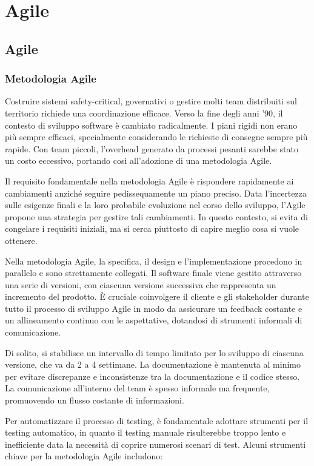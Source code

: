 \chapter{Agile}
\section{Agile}
\subsection{Metodologia Agile}
Costruire sistemi safety-critical, governativi o gestire molti team distribuiti sul territorio richiede una
coordinazione efficace. Verso la fine degli anni '90, il contesto di sviluppo software è cambiato radicalmente.
I piani rigidi non erano più sempre efficaci, specialmente considerando le richieste di consegne sempre più rapide.
Con team piccoli, l'overhead generato da processi pesanti sarebbe stato un costo eccessivo, portando così all'adozione
di una metodologia Agile.

Il requisito fondamentale nella metodologia Agile è rispondere rapidamente ai cambiamenti anziché seguire pedissequamente
un piano preciso. Data l'incertezza sulle esigenze finali e la loro probabile evoluzione nel corso dello sviluppo,
l'Agile propone una strategia per gestire tali cambiamenti. In questo contesto, si evita di congelare i requisiti
iniziali, ma si cerca piuttosto di capire meglio cosa si vuole ottenere.

Nella metodologia Agile, la specifica, il design e l'implementazione procedono in parallelo e sono strettamente collegati.
Il software finale viene gestito attraverso una serie di versioni, con ciascuna versione successiva che rappresenta un
incremento del prodotto. È cruciale coinvolgere il cliente e gli stakeholder durante tutto il processo di sviluppo Agile
in modo da assicurare un feedback costante e un allineamento continuo con le aspettative,
dotandosi di strumenti informali di comunicazione.

Di solito, si stabilisce un intervallo di tempo limitato per lo sviluppo di ciascuna versione, che va da 2 a 4 settimane.
La documentazione è mantenuta al minimo per evitare discrepanze e inconsistenze tra la documentazione e il codice stesso.
La comunicazione all'interno del team è spesso informale ma frequente, promuovendo un flusso costante di informazioni.

Per automatizzare il processo di testing, è fondamentale adottare strumenti per il testing automatico, in quanto il testing
manuale risulterebbe troppo lento e inefficiente data la necessità di coprire numerosi scenari di test. Alcuni strumenti
chiave per la metodologia Agile includono:

